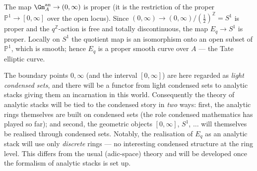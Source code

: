 \begin{proposition}
\label{prop:14:Eq-proper-smooth}
The map ${\Gm}^{\mathrm{an}}_{A}\to(0,\infty)$ is proper (it is the restriction of the
proper $\mathbb{P}^1\to[0,\infty]$ over the open locus). Since $(0,\infty)\to(0,\infty)/(\tfrac12)^{\mathbb{Z}}=S^1$ is
proper and the $q^{\mathbb{Z}}$-action is free and totally discontinuous, the map
$E_q\to S^1$ is proper. Locally on $S^1$ the quotient map is an isomorphism onto an
open subset of $\mathbb{P}^1$, which is smooth; hence $E_q$ is a proper smooth curve
over $A$ --- the Tate elliptic curve.
\end{proposition}

\begin{remark}
\label{rmk:14:two-roles}
The boundary points $0,\infty$ (and the interval $[0,\infty]$) are here regarded as
\emph{light condensed sets}, and there will be a functor from light condensed sets to
analytic stacks giving them an incarnation in this world. Consequently the theory of
analytic stacks will be tied to the condensed story in \emph{two} ways: first, the
analytic rings themselves are built on condensed sets (the role condensed mathematics
has played so far); and second, the geometric objects $[0,\infty]$, $S^1$, $\dots$
will themselves be realised through condensed sets. Notably, the realisation of $E_q$
as an analytic stack will use only \emph{discrete} rings --- no interesting condensed
structure at the ring level. This differs from the usual (adic-space) theory and will
be developed once the formalism of analytic stacks is set up.
\end{remark}
